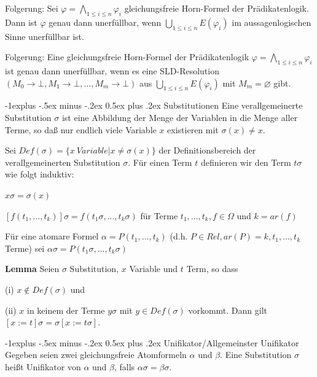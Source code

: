 \documentclass[a4paper]{article}
\makeatletter
\renewcommand{\note}[2]{\begin{noteBox} \textbf{#1} #2 \end{noteBox}}
\renewcommand{\subsection}{\@startsection{subsection}{2}{0mm}%
                {-1explus -.5ex minus -.2ex}%
                {0.5ex plus .2ex}%
                {\normalfont\normalsize\bfseries}}
\makeatother
\begin{document}
\begin{multicols}{3}
  Folgerung: Sei $\varphi =\bigwedge_{1\leq i\leq n} \varphi_i$ gleichungsfreie Horn-Formel der Prädikatenlogik. Dann ist $\varphi$ genau dann unerfüllbar, wenn $\bigcup_{1\leq i\leq n} E(\varphi_i)$ im aussagenlogischen Sinne unerfüllbar ist.

  Folgerung: Eine gleichungsfreie Horn-Formel der Prädikatenlogik $\varphi=\bigwedge_{1\leq i\leq n} \varphi_i$ ist genau dann unerfüllbar, wenn es eine SLD-Resolution $(M_0\rightarrow\bot,M_1\rightarrow\bot,...,M_m\rightarrow\bot)$ aus $\bigcup_{1\leq i\leq n} E(\varphi_i)$ mit $M_m =\varnothing$ gibt.

  \subsection{Substitutionen}
  Eine verallgemeinerte Substitution $\sigma$ ist eine Abbildung der Menge der Variablen in die Menge aller Terme, so daß nur endlich viele Variable $x$ existieren mit $\sigma(x) \not=x$.

  Sei $Def(\sigma)=\{x\ Variable|x\not =\sigma(x)\}$ der Definitionsbereich der verallgemeinerten Substitution $\sigma$. Für einen Term $t$ definieren wir den Term $t\sigma$ wie folgt induktiv:
  \begin{itemize*}
    \item $x\sigma=\sigma(x)$
    \item $[f(t_1 ,... ,t_k)]\sigma=f(t_1\sigma,... ,t_k\sigma)$ für Terme $t_1,... ,t_k,f\in\Omega$ und $k=ar(f)$
    \item Für eine atomare Formel $\alpha=P(t_1 ,... ,t_k)$ (d.h. $P\in Rel,ar(P) =k,t_1 ,... ,t_k$ Terme) sei $\alpha\sigma = P(t_1\sigma,... ,t_k\sigma)$
  \end{itemize*}

  \note{Lemma}{Seien $\sigma$ Substitution, $x$ Variable und $t$ Term, so dass
    \begin{itemize*}
      \item (i) $x\not\in Def(\sigma)$ und
      \item (ii) $x$ in keinem der Terme $y\sigma$ mit $y\in Def(\sigma)$ vorkommt.
      Dann gilt $[x:=t]\sigma=\sigma[x:=t\sigma]$.
    \end{itemize*}
  }

  \subsection{Unifikator/Allgemeinster Unifikator}
  Gegeben seien zwei gleichungsfreie Atomformeln $\alpha$ und $\beta$. Eine Substitution $\sigma$ heißt Unifikator von $\alpha$ und $\beta$, falls $\alpha\sigma=\beta\sigma$.


\end{multicols}
\end{document}
